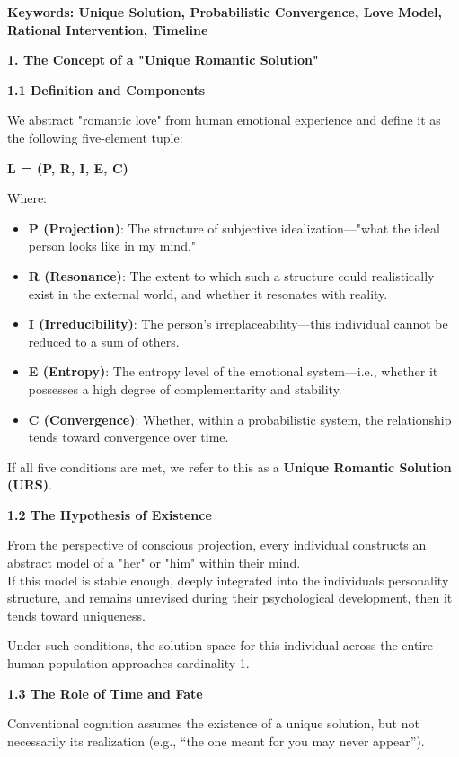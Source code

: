 \documentclass[
]{article}
\begin{document}
\textbf{Keywords: Unique Solution, Probabilistic Convergence, Love
Model, Rational Intervention, Timeline}

\textbf{1. The Concept of a "Unique Romantic Solution"}

\textbf{1.1 Definition and Components}

We abstract "romantic love" from human emotional experience and define
it as the following five-element tuple:

\textbf{L = (P, R, I, E, C)}

Where:

\begin{itemize}
\item
  \textbf{P (Projection)}: The structure of subjective
  idealization---"what the ideal person looks like in my mind."
\item
  \textbf{R (Resonance)}: The extent to which such a structure could
  realistically exist in the external world, and whether it resonates
  with reality.
\item
  \textbf{I (Irreducibility)}: The person's irreplaceability---this
  individual cannot be reduced to a sum of others.
\item
  \textbf{E (Entropy)}: The entropy level of the emotional
  system---i.e., whether it possesses a high degree of complementarity
  and stability.
\item
  \textbf{C (Convergence)}: Whether, within a probabilistic system, the
  relationship tends toward convergence over time.
\end{itemize}

If all five conditions are met, we refer to this as a \textbf{Unique
Romantic Solution (URS)}.

\textbf{1.2 The Hypothesis of Existence}

From the perspective of conscious projection, every individual
constructs an abstract model of a "her" or "him" within their mind.\\
If this model is stable enough, deeply integrated into the
individual\textquotesingle s personality structure, and remains
unrevised during their psychological development, then it tends toward
uniqueness.

Under such conditions, the solution space for this individual across the
entire human population approaches cardinality 1.

\textbf{1.3 The Role of Time and Fate}

Conventional cognition assumes the existence of a unique solution, but
not necessarily its realization (e.g., ``the one meant for you may never
appear'').
\end{document}
